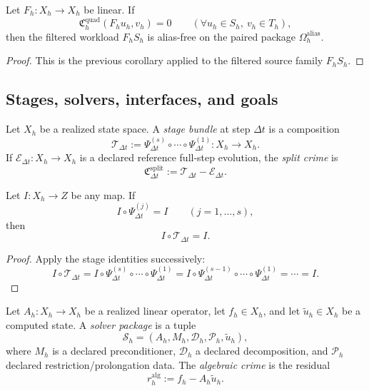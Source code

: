 \begin{proposition}
\label{prop:certified-dealiasing-selected-workload}
Let \(F_h:X_h\to X_h\) be linear. If
\[
\mathfrak C_h^{\mathrm{quad}}(F_hu_h,v_h)=0
\qquad
(\forall u_h\in S_h,\ v_h\in T_h),
\]
then the filtered workload \(F_hS_h\) is alias-free on the paired package
\(\Omega_h^{\mathrm{alias}}\).
\end{proposition}

\begin{proof}
This is the previous corollary applied to the filtered source family
\(F_hS_h\).
\end{proof}

\subsection{Stages, solvers, interfaces, and goals}

\begin{definition}
\label{def:stage-bundle-split-crime}
Let \(X_h\) be a realized state space. A \emph{stage bundle} at step
\(\Delta t\) is a composition
\[
\mathcal T_{\Delta t}
:=
\Psi^{(s)}_{\Delta t}\circ\cdots\circ\Psi^{(1)}_{\Delta t}
:X_h\to X_h.
\]
If \(\mathcal E_{\Delta t}:X_h\to X_h\) is a declared reference full-step
evolution, the \emph{split crime} is
\[
\mathfrak C_{\Delta t}^{\mathrm{split}}
:=
\mathcal T_{\Delta t}-\mathcal E_{\Delta t}.
\]
\end{definition}

\begin{proposition}
\label{prop:stagewise-invariants-survive-composition}
Let \(I:X_h\to Z\) be any map. If
\[
I\circ \Psi^{(j)}_{\Delta t}=I
\qquad
(j=1,\dots,s),
\]
then
\[
I\circ\mathcal T_{\Delta t}=I.
\]
\end{proposition}

\begin{proof}
Apply the stage identities successively:
\[
I\circ\mathcal T_{\Delta t}
=
I\circ \Psi^{(s)}_{\Delta t}\circ\cdots\circ\Psi^{(1)}_{\Delta t}
=
I\circ \Psi^{(s-1)}_{\Delta t}\circ\cdots\circ\Psi^{(1)}_{\Delta t}
=
\cdots
=
I.
\]
\end{proof}

\begin{definition}
\label{def:solver-package-algebraic-crime}
Let \(A_h:X_h\to X_h\) be a realized linear operator, let \(f_h\in X_h\), and
let \(\widetilde u_h\in X_h\) be a computed state. A \emph{solver package} is a
tuple
\[
\mathcal S_h=(A_h,M_h,\mathcal D_h,\mathcal P_h,\widetilde u_h),
\]
where \(M_h\) is a declared preconditioner, \(\mathcal D_h\) a declared
decomposition, and \(\mathcal P_h\) declared restriction/prolongation data. The
\emph{algebraic crime} is the residual
\[
r_h^{\mathrm{alg}}:=f_h-A_h\widetilde u_h.
\]
\end{definition}

